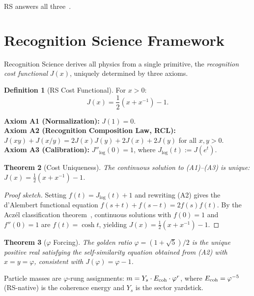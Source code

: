\documentclass[12pt,a4paper]{article}
\newtheorem{theorem}{Theorem}[section]
\theoremstyle{definition}
\newtheorem{definition}[theorem]{Definition}
\theoremstyle{remark}
\begin{document}
RS answers all three~\cite{RS_Axioms}.

\section{Recognition Science Framework}
\label{sec:framework}

Recognition Science derives all physics from a single primitive,
the \emph{recognition cost functional} $J(x)$, uniquely determined
by three axioms.

\begin{definition}[RS Cost Functional]
For $x > 0$:
\begin{equation}
  J(x) = \frac{1}{2}\!\left(x + x^{-1}\right) - 1.
\end{equation}
\end{definition}

\noindent\textbf{Axiom A1 (Normalization):} $J(1) = 0$.\\
\textbf{Axiom A2 (Recognition Composition Law, RCL):}
$J(xy) + J(x/y) = 2J(x)J(y) + 2J(x) + 2J(y)$ for all $x, y > 0$.\\
\textbf{Axiom A3 (Calibration):} $J''_{\log}(0) = 1$, where
$J_{\log}(t) := J(e^t)$.

\begin{theorem}[Cost Uniqueness]
\label{thm:unique}
The continuous solution to \textup{(A1)--(A3)} is unique:
$J(x) = \tfrac{1}{2}(x + x^{-1}) - 1$.
\end{theorem}

\begin{proof}[Proof sketch]
Setting $f(t) = J_{\log}(t) + 1$ and rewriting \textup{(A2)} gives
the d'Alembert functional equation $f(s+t) + f(s-t) = 2f(s)f(t)$.
By the Acz\'el classification theorem~\cite{Aczel1966}, continuous
solutions with $f(0) = 1$ and $f''(0) = 1$ are $f(t) = \cosh t$,
yielding $J(x) = \tfrac{1}{2}(x + x^{-1}) - 1$.
\end{proof}

\begin{theorem}[$\varphi$ Forcing]
\label{thm:phi}
The golden ratio $\varphi = (1+\sqrt{5})/2$ is the unique positive
real satisfying the self-similarity equation obtained from \textup{(A2)}
with $x = y = \varphi$, consistent with $J(\varphi) = \varphi - 1$.
\end{theorem}

\noindent Particle masses are $\varphi$-rung assignments:
$m = Y_s \cdot E_{\rm coh} \cdot \varphi^r$,
where $E_{\rm coh} = \varphi^{-5}$ (RS-native) is the coherence energy
and $Y_s$ is the sector yardstick.
\end{document}
